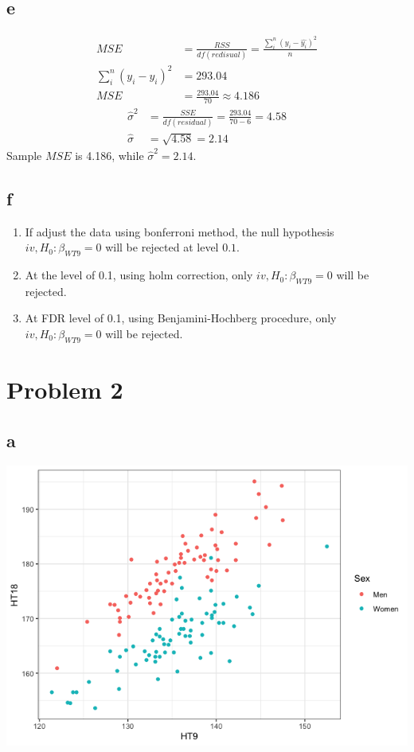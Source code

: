 \documentclass[11pt,letterpaper]{article}
\begin{document}
\subsection*{e}
\begin{align*}
MSE &= \frac{RSS}{df(redisual)} = \frac{\sum_i^n (y_i - \hat{y_i})^2}{n} \\
\sum_i^n (y_i - \hat{y_i})^2 &= 293.04 \\
MSE &= \frac{293.04}{70} \approx 4.186
\end{align*}
\begin{align*}
\hat{\sigma}^2 &= \frac{SSE}{df(residual)} = \frac{293.04}{70 - 6} = 4.58 \\
\hat{\sigma} &= \sqrt{4.58} = 2.14
\end{align*}
Sample $MSE$ is 4.186, while $\hat{\sigma}^2 = 2.14$. 

\subsection*{f}
\begin{enumerate}[label=\roman*.]
\item If adjust the data using bonferroni method, the null hypothesis $iv, H_0: \beta_{WT9} = 0$ will be rejected at level $0.1$. 
\item At the level of 0.1, using holm correction, only $iv, H_0: \beta_{WT9} = 0$ will be rejected. 
\item At FDR level of 0.1, using Benjamini-Hochberg procedure, only $iv, H_0: \beta_{WT9} = 0$ will be rejected.
\end{enumerate}

\section*{Problem 2}
\subsection*{a}
\includegraphics[scale=0.7]{2-a-1.png}
\end{document}
